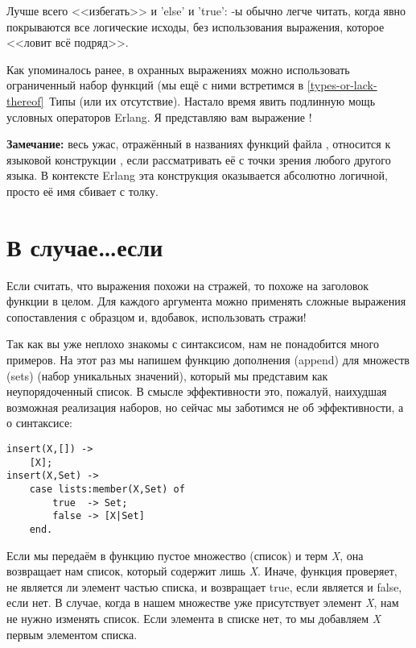 Лучше всего <<избегать>> и 'else' и 'true': \--ы обычно легче читать, когда явно покрываются все логические исходы, без использования выражения, которое <<ловит всё подряд>>.

Как упоминалось ранее, в охранных выражениях можно использовать ограниченный набор функций (мы ещё с ними встретимся в \ref{types-or-lack-thereof}~Типы (или их отсутствие).
Настало время явить подлинную мощь условных операторов Erlang.
Я представляю вам выражение !\\
\colorbox{lgray}
{
    \begin{minipage}{\linewidth}
\textbf{Замечание:} весь ужас, отражённый в названиях функций файла , относится к языковой конструкции , если рассматривать её с точки зрения  любого другого языка.
В контексте Erlang эта конструкция оказывается абсолютно логичной, просто её имя сбивает с толку.
    \end{minipage}
}
\section{В случае\ldots если}
\label{in-case-of}

Если считать, что выражения  похожи на стражей, то  похоже на заголовок функции в целом.
Для каждого аргумента можно применять сложные выражения сопоставления с образцом и, вдобавок, использовать стражи!

Так как вы уже неплохо знакомы с синтаксисом, нам не понадобится много примеров.
На этот раз мы напишем функцию дополнения (append) для множеств (sets) (набор уникальных значений), который мы представим как неупорядоченный список.
В смысле эффективности это, пожалуй, наихудшая возможная реализация наборов, но сейчас мы заботимся не об эффективности, а о синтаксисе:
\begin{lstlisting}[style=erlang]
insert(X,[]) ->
    [X];
insert(X,Set) ->
    case lists:member(X,Set) of
        true  -> Set;
        false -> [X|Set]
    end.
\end{lstlisting}
Если мы передаём в функцию пустое множество (список) и терм \emph{X}, она возвращает нам список, который содержит лишь \emph{X}.
Иначе, функция  проверяет, не является ли элемент частью списка, и возвращает true, если является и false, если нет.
В случае, когда в нашем множестве уже присутствует элемент \emph{X}, нам не нужно изменять список.
Если элемента в списке нет, то мы добавляем \emph{X} первым элементом списка.

